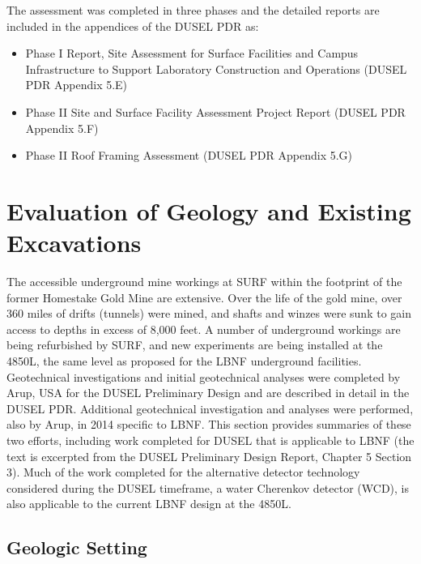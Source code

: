 The assessment %
was completed in three phases and the detailed reports are included in the appendices of the DUSEL PDR as:

\begin{itemize}
 \item Phase I Report, Site Assessment for Surface Facilities and Campus Infrastructure to Support Laboratory Construction and Operations (DUSEL PDR Appendix 5.E)
 \item Phase II Site and Surface Facility Assessment Project Report (DUSEL PDR Appendix 5.F)
 \item Phase II Roof Framing Assessment (DUSEL PDR Appendix 5.G)
     \end{itemize}


\section{Evaluation of Geology and Existing Excavations}
\label{sec:fscf-site-cond-geo}

The accessible underground mine workings at SURF within the footprint of the former Homestake Gold Mine are extensive.  %
Over the life of the gold mine, over 360 miles of drifts (tunnels) were mined, and shafts and winzes were sunk to gain access to depths in excess of 8,000 feet. A number of underground workings are being refurbished by SURF, and new experiments are being installed %
at the 4850L, the same level as proposed for the LBNF underground facilities. Geotechnical investigations and initial geotechnical analyses were completed by Arup, USA  for the DUSEL Preliminary Design and are described in detail in the DUSEL PDR. Additional geotechnical investigation and analyses were performed, also by Arup, in 2014 specific to LBNF.  This section provides summaries of these two efforts, including work completed for DUSEL that is applicable to LBNF (the text is excerpted from the DUSEL Preliminary Design Report, Chapter 5 Section 3). Much of the work completed for the alternative detector technology considered during the DUSEL timeframe, a water Cherenkov detector (WCD), is also applicable to the current LBNF design at the 4850L.  


\subsection{Geologic Setting}
\label{sec:fscf-site-cond-geo-set}


